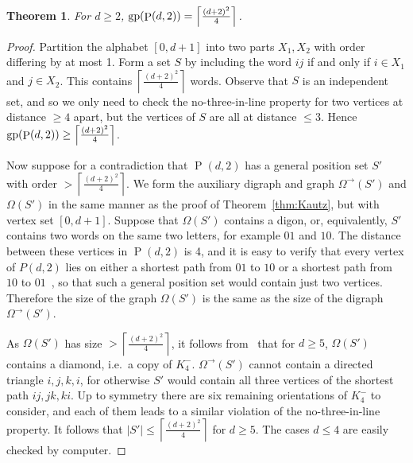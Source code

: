 \documentclass[a4paper,12pt]{article}
\newtheorem{theorem}{Theorem}[section]
\theoremstyle{definition}
\newcommand{\gp}{{\rm gp}}
\DeclareMathOperator{\Pe}{P}
\begin{document}
	\begin{theorem}
		For $d \geq 2$, $\gp (\Pe(d,2)) = \left \lceil \frac{(d+2)^2}{4} \right \rceil $.
	\end{theorem}
	\begin{proof}
		Partition the alphabet $[0,d+1]$ into two parts $X_1,X_2$ with order differing by at most 1. Form a set $S$ by including the word $ij$ if and only if $i \in X_1$ and $j \in X_2$. This contains $\left \lceil \frac{(d+2)^2}{4} \right \rceil $ words. Observe that $S$ is an independent set, and so we only need to check the no-three-in-line property for two vertices at distance $\geq 4$ apart, but the vertices of $S$ are all at distance $\leq 3$. Hence $\gp (\Pe(d,2)) \geq \left \lceil \frac{(d+2)^2}{4} \right \rceil $. 
		
		Now suppose for a contradiction that $\Pe(d,2)$ has a general position set $S'$ with order $> \left \lceil \frac{(d+2)^2}{4} \right \rceil $. We form the auxiliary digraph and graph $\Omega ^{\rightarrow }(S')$ and $\Omega (S')$ in the same manner as the proof of Theorem~\ref{thm:Kautz}, but with vertex set $[0,d+1]$. Suppose that $\Omega (S')$ contains a digon, or, equivalently, $S'$ contains two words on the same two letters, for example $01$ and $10$. The distance between these vertices in $\Pe (d,2)$ is 4, and it is easy to verify that every vertex of $P(d,2)$ lies on either a shortest path from $01$ to $10$ or a shortest path from $10$ to $01$~\cite{Brunat}, so that such a general position set would contain just two vertices. Therefore the size of the graph $\Omega (S')$ is the same as the size of the digraph $\Omega ^{\rightarrow }(S')$. 
		
		As $\Omega (S')$ has size $> \left \lceil \frac{(d+2)^2}{4} \right \rceil $, it follows from~\cite{Dirac,Erdos} that for $d \geq 5$, $\Omega (S')$ contains a diamond, i.e.\ a copy of $K_4^-$. $\Omega ^{\rightarrow }(S')$ cannot contain a directed triangle $i,j,k,i$, for otherwise $S'$ would contain all three vertices of the shortest path $ij,jk,ki$. Up to symmetry there are six remaining orientations of $K_4^-$ to consider, and each of them leads to a similar violation of the no-three-in-line property. It follows that $|S'| \leq \left \lceil \frac{(d+2)^2}{4} \right \rceil$ for $d \geq 5$. The cases $d \leq 4$ are easily checked by computer.
		
		
	\end{proof}
	
	
	
\end{document}
